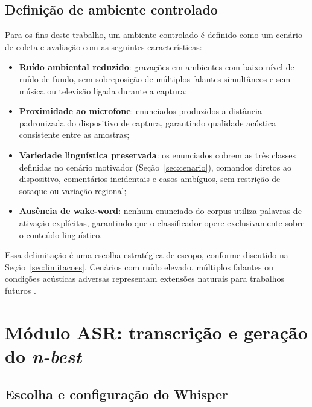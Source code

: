 \documentclass[
    12pt,                %
    openright,           %
    oneside,             %
    a4paper,             %
    english,             %
    brazil               %
]{abntex2}
\begin{document}
\subsection{Definição de ambiente controlado}
\label{sec:ambiente}

Para os fins deste trabalho, um ambiente controlado é definido como um cenário de coleta e avaliação com as seguintes características:

\begin{itemize}
    \item \textbf{Ruído ambiental reduzido}: gravações em ambientes com baixo nível de ruído de fundo, sem sobreposição de múltiplos falantes simultâneos e sem música ou televisão ligada durante a captura;

    \item \textbf{Proximidade ao microfone}: enunciados produzidos a distância padronizada do dispositivo de captura, garantindo qualidade acústica consistente entre as amostras;

    \item \textbf{Variedade linguística preservada}: os enunciados cobrem as três classes definidas no cenário motivador (Seção~\ref{sec:cenario}), comandos diretos ao dispositivo, comentários incidentais e casos ambíguos, sem restrição de sotaque ou variação regional;

    \item \textbf{Ausência de wake-word}: nenhum enunciado do corpus utiliza palavras de ativação explícitas, garantindo que o classificador opere exclusivamente sobre o conteúdo linguístico.
\end{itemize}

Essa delimitação é uma escolha estratégica de escopo, conforme discutido na Seção~\ref{sec:limitacoes}. Cenários com ruído elevado, múltiplos falantes ou condições acústicas adversas representam extensões naturais para trabalhos futuros \cite{CORAA2023}.

\section{Módulo ASR: transcrição e geração do \textit{n-best}}
\label{sec:modulo_asr}

\subsection{Escolha e configuração do Whisper}
\label{sec:whisper_config}
\end{document}
